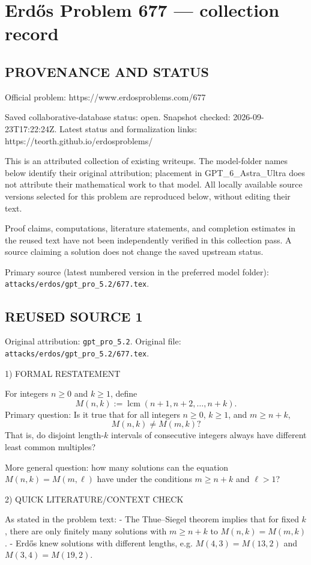 \section*{Erd\H{o}s Problem 677 --- collection record}

\subsection*{PROVENANCE AND STATUS}
Official problem: https://www.erdosproblems.com/677

Saved collaborative-database status: open.
Snapshot checked: 2026-09-23T17:22:24Z.
Latest status and formalization links: https://teorth.github.io/erdosproblems/

This is an attributed collection of existing writeups. The model-folder names below identify their original attribution; placement in GPT\_6\_Astra\_Ultra does not attribute their mathematical work to that model. All locally available source versions selected for this problem are reproduced below, without editing their text.

Proof claims, computations, literature statements, and completion estimates in the reused text have not been independently verified in this collection pass. A source claiming a solution does not change the saved upstream status.

Primary source (latest numbered version in the preferred model folder): \texttt{attacks/erdos/gpt\_pro\_5.2/677.tex}.

\subsection*{REUSED SOURCE 1}
Original attribution: \texttt{gpt\_pro\_5.2}.
Original file: \texttt{attacks/erdos/gpt\_pro\_5.2/677.tex}.


1) FORMAL RESTATEMENT

For integers $n\ge 0$ and $k\ge 1$, define
\[
M(n,k):=\operatorname{lcm}(n+1,n+2,\dots,n+k).
\]
Primary question: Is it true that for all integers $n\ge 0$, $k\ge 1$, and $m\ge n+k$,
\[
 M(n,k)\ne M(m,k)?
\]
That is, do disjoint length-$k$ intervals of consecutive integers always have different least common multiples?

More general question: how many solutions can the equation $M(n,k)=M(m,\ell)$ have under the conditions $m\ge n+k$ and $\ell>1$?

2) QUICK LITERATURE/CONTEXT CHECK

As stated in the problem text:
- The Thue--Siegel theorem implies that for fixed $k$, there are only finitely many solutions with $m\ge n+k$ to $M(n,k)=M(m,k)$.
- Erd\H{o}s knew solutions with different lengths, e.g. $M(4,3)=M(13,2)$ and $M(3,4)=M(19,2)$.

